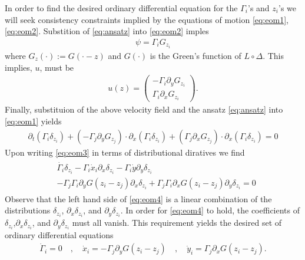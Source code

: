 \documentclass[12pt]{amsart}
\begin{document}
In order to find the desired ordinary differential equation for the $\Gamma_i$'s and $z_i$'s we will seek consistency constraints implied by the equations of motion \eqref{eq:eom1},\eqref{eq:eom2}.
Substition of \eqref{eq:ansatz} into \eqref{eq:eom2} imples
\begin{align*}
  \psi = \Gamma_i G_{z_i}
\end{align*}
where $G_{z}(\cdot) := G( \cdot - z)$ and  $G(\cdot)$ is the Green's function of $L \circ \Delta$.
This implies, $u$, must be
\begin{align*}
  u(z) = \begin{pmatrix}
   - \Gamma_i \partial_y G_{z_i} \\
    \Gamma_i \partial_x G_{z_i}
  \end{pmatrix}.
\end{align*}
Finally, substituion of the above velocity field
and the ansatz \eqref{eq:ansatz} into \eqref{eq:eom1} yields
\begin{align}
  \partial_t ( \Gamma_i \delta_{z_i}) +  (- \Gamma_j \partial_yG_{z_j}) \cdot \partial_x ( \Gamma_i \delta_{z_i})  +
  (\Gamma_j \partial_x G_{z_j} ) \cdot \partial_x ( \Gamma_i \delta_{z_i})= 0 \label{eq:eom3}
\end{align}
Upon writing \eqref{eq:eom3} in terms of distributional diratives we find
\begin{align}
  \begin{split}
  &\dot{\Gamma_i} \delta_{z_i} - \Gamma_i \dot{x}_i \partial_x \delta_{z_i}
  - \Gamma_i \dot{y} \partial_y \delta_{z_i} \\
  &- \Gamma_j \Gamma_i \partial_yG(z_i - z_j) \partial_x \delta_{z_i}  +
  \Gamma_j \Gamma_i \partial_x G(z_i-z_j) \partial_y \delta_{z_i}= 0 
  \end{split}
  \label{eq:eom4}
\end{align}
Observe that the left hand side of \eqref{eq:eom4}
is a linear combination of the distributions
$\delta_{z_i}$, $\partial_x\delta_{z_i}$, and $\partial_y \delta_{z_i}$.
In order for \eqref{eq:eom4} to hold, the coefficients of $\delta_{z_i}$,$\partial_x \delta_{z_i}$, and $\partial_y \delta_{z_i}$ must all vanish.
This requirement yields the desired set of ordinary differential equations
\begin{align*}
  \dot{\Gamma}_i = 0 \quad,\quad
  \dot{x}_i = - \Gamma_j \partial_y G(z_i - z_j) \quad,\quad
  \dot{y}_i =  \Gamma_j \partial_x G(z_i - z_j).
\end{align*}

\end{document}
